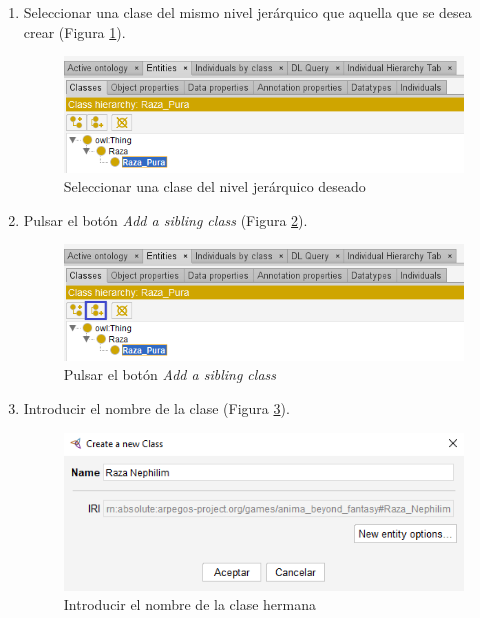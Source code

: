 \begin{enumerate}

    \item Seleccionar una clase del mismo nivel jerárquico que aquella que se desea crear (Figura \ref*{CreateClass_5}).
    
    \begin{figure}[ht]
        \centering
        \includegraphics[scale=0.6]{Figures/Protege/CreateClass_5.png}
        \caption{Seleccionar una clase del nivel jerárquico deseado}
        \label{CreateClass_5}
    \end{figure}

    \item Pulsar el botón \textit{Add a sibling class} (Figura \ref*{CreateClass_6}).

    \begin{figure}[ht]
        \centering
        \includegraphics[scale=0.6]{Figures/Protege/CreateClass_6.png}
        \caption{Pulsar el botón \textit{Add a sibling class}}
        \label{CreateClass_6}
    \end{figure}

    \item Introducir el nombre de la clase (Figura \ref*{CreateClass_7}).
    
    \begin{figure}[ht]
        \centering
        \includegraphics[scale=0.6]{Figures/Protege/CreateClass_7.png}
        \caption{Introducir el nombre de la clase hermana}
        \label{CreateClass_7}
    \end{figure}


\end{enumerate}
